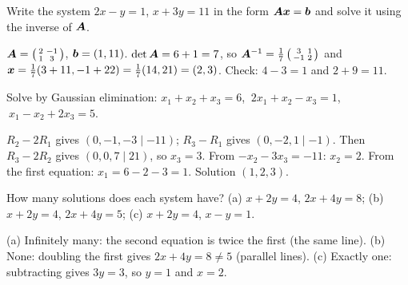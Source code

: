 \sectionexercises

\begin{exercise}
Write the system $2x - y = 1$, $x + 3y = 11$ in the form $\bm{A}\bm{x} = \bm{b}$ and
solve it using the inverse of $\bm{A}$.
\end{exercise}
\begin{solution}
$\bm{A} = \left(\begin{smallmatrix} 2 & -1\\ 1 & 3\end{smallmatrix}\right)$,
$\bm{b} = (1, 11)$. $\det\bm{A} = 6 + 1 = 7$, so
$\bm{A}^{-1} = \tfrac17\left(\begin{smallmatrix} 3 & 1\\ -1 &
2\end{smallmatrix}\right)$ and $\bm{x} = \tfrac17(3 + 11, -1 + 22) = \tfrac17(14,
21) = (2, 3)$. Check: $4 - 3 = 1$ and $2 + 9 = 11$.
\end{solution}

\begin{exercise}
Solve by Gaussian elimination:
$x_1 + x_2 + x_3 = 6$, $\ 2x_1 + x_2 - x_3 = 1$, $\ x_1 - x_2 + 2x_3 = 5$.
\end{exercise}
\begin{solution}
$R_2 - 2R_1$ gives $(0, -1, -3 \mid -11)$; $R_3 - R_1$ gives
$(0, -2, 1 \mid -1)$. Then $R_3 - 2R_2$ gives $(0, 0, 7 \mid 21)$, so
$x_3 = 3$. From $-x_2 - 3x_3 = -11$: $x_2 = 2$. From the first equation:
$x_1 = 6 - 2 - 3 = 1$. Solution $(1, 2, 3)$.
\end{solution}

\begin{exercise}
How many solutions does each system have? (a) $x + 2y = 4$, $2x + 4y = 8$;
(b) $x + 2y = 4$, $2x + 4y = 5$; (c) $x + 2y = 4$, $x - y = 1$.
\end{exercise}
\begin{solution}
(a) Infinitely many: the second equation is twice the first (the same line).
(b) None: doubling the first gives $2x + 4y = 8 \neq 5$ (parallel lines).
(c) Exactly one: subtracting gives $3y = 3$, so $y = 1$ and $x = 2$.
\end{solution}

